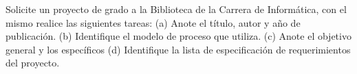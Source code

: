 Solicite un proyecto de grado a la Biblioteca de la Carrera de Informática, con el mismo realice las siguientes tareas: (a) Anote el título, autor y año de publicación. (b) Identifique el modelo de proceso que utiliza. (c) Anote el objetivo general y los específicos (d) Identifique la lista de especificación de requerimientos del proyecto.
